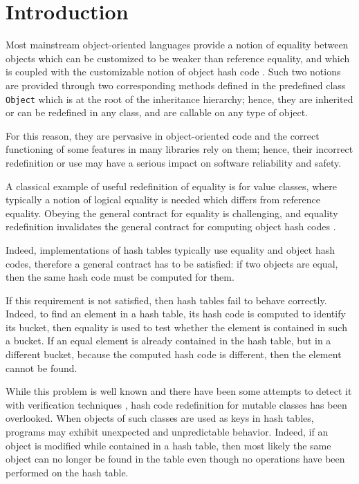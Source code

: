 \section{Introduction}

Most mainstream object-oriented languages provide a notion of equality between objects which can be customized to be weaker than
reference equality, and which is coupled with the customizable notion of object hash code \cite{Bloch18}. Such two notions are provided
through two corresponding methods defined in the predefined class \lstinline{Object} which is at the root of the inheritance hierarchy; hence,
they are inherited or can be redefined in any class, and are callable on any type of object.

For this reason, they are pervasive in object-oriented code and the correct functioning of some features in many libraries rely on them;
hence, their incorrect redefinition or use may have a serious impact on software reliability and safety.

A classical example of useful redefinition of equality is for value classes, where typically a notion of logical equality is needed which differs
from reference equality. 
Obeying the general contract for equality is challenging, and equality redefinition invalidates the general contract for computing
object hash codes \cite{Bloch18}.

Indeed, implementations of hash tables typically use equality and object hash codes, therefore
a general contract has to be satisfied: if two objects are equal,
then the same hash code must be computed for them.

If this requirement is not satisfied, then hash tables fail to behave correctly.
Indeed, to find an element in a hash table, its hash code is computed to identify its bucket, then
equality is used to test whether the element is contained in such a bucket. If an equal element is already contained in the hash table, but in
a different bucket, because the computed hash code is different, then the element cannot be found.

While this problem is well known and there have been some attempts to detect it with verification techniques \cite{Bloch18,OkanoHSON19},
hash code redefinition for mutable classes has been overlooked.
When objects of such classes are used as keys in hash tables, programs may exhibit unexpected and unpredictable behavior. Indeed,
if an object is modified while contained in a hash table, then most likely the same object can no longer be found in the table
even though no operations have been performed on the hash table.

